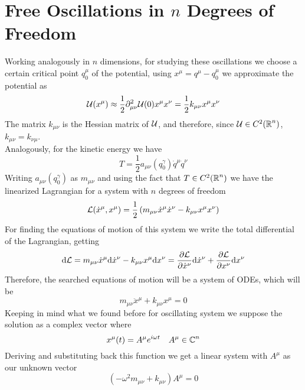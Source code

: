 \documentclass[../admech.tex]{subfiles}
\begin{document}
\section{Free Oscillations in $n$ Degrees of Freedom}
Working analogously in $n$ dimensions, for studying these oscillations we choose a certain critical point $q_0^\mu$ of the potential, using $x^\mu=q^\mu-q_0^\mu$ we approximate the potential as
\begin{equation}
	\mathcal{U}(x^\mu)\approx\frac{1}{2}\partial^2_{\mu\nu}\mathcal{U}(0)x^\mu x^\nu=\frac{1}{2}k_{\mu\nu}x^\mu x^\nu
	\label{eq:approxpotndeg}
\end{equation}
The matrix $k_{\mu\nu}$ is the Hessian matrix of $\mathcal{U}$, and therefore, since $\mathcal{U}\in C^2(\operatorname{\mathbb{R}}^n)$, $k_{\mu\nu}=k_{\nu\mu}$.\\
Analogously, for the kinetic energy we have
\begin{equation}
	T=\frac{1}{2}a_{\mu\nu}(q_0^\gamma)\dot{q}^\mu\dot{q}^\nu
	\label{eq:osckinndeg}
\end{equation}
Writing $a_{\mu\nu}(q_0^\gamma)$ as $m_{\mu\nu}$ and using the fact that $T\in C^2(\operatorname{\mathbb{R}}^n)$ we have the linearized Lagrangian for a system with $n$ degrees of freedom
\begin{equation}
	\mathcal{L}(\dot{x}^\mu,x^\mu)=\frac{1}{2}\left( m_{\mu\nu}\dot{x}^\mu\dot{x}^\nu-k_{\mu\nu}x^\mu x^\nu \right)
	\label{eq:linlagnosc}
\end{equation}
For finding the equations of motion of this system we write the total differential of the Lagrangian, getting
\begin{equation}
	\dd\mathcal{L}=m_{\mu\nu}\dot{x}^\mu\dd\dot{x}^\nu-k_{\mu\nu}x^\mu\dd x^\nu=\pdv{\mathcal{L}}{\dot{x}^\nu}\dd\dot{x}^\nu+\pdv{\mathcal{L}}{x^\nu}\dd x^\nu
	\label{eq:linlagdif}
\end{equation}
Therefore, the searched equations of motion will be a system of ODEs, which will be
\begin{equation}
	m_{\mu\nu}\ddot{x}^\mu+k_{\mu\nu}x^\mu=0
	\label{eq:odeoscndeg}
\end{equation}
Keeping in mind what we found before for oscillating system we suppose the solution as a complex vector where
\begin{equation*}
	x^\mu(t)=A^\mu e^{i\omega t}\quad A^\mu\in\operatorname{\mathbb{C}}^n
\end{equation*}
Deriving and substituting back this function we get a linear system with $A^\mu$ as our unknown vector
\begin{equation}
	\left( -\omega^2m_{\mu\nu}+k_{\mu\nu} \right)A^\mu=0
	\label{eq:oscsystem}
\end{equation}
\end{document}
